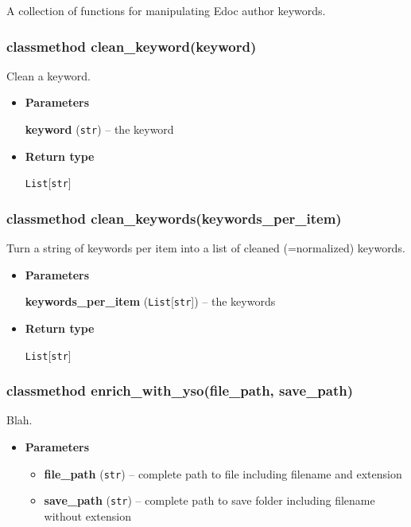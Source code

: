 A collection of functions for manipulating Edoc author keywords.

\hypertarget{classmethod-clean_keywordkeyword}{%
\subsubsection{classmethod
clean\_keyword(keyword)}\label{classmethod-clean_keywordkeyword}}

Clean a keyword.

\begin{itemize}
\item
  \textbf{Parameters}

  \textbf{keyword} (\texttt{str}) -- the keyword
\item
  \textbf{Return type}

  \texttt{List}{[}\texttt{str}{]}
\end{itemize}

\hypertarget{classmethod-clean_keywordskeywords_per_item}{%
\subsubsection{classmethod
clean\_keywords(keywords\_per\_item)}\label{classmethod-clean_keywordskeywords_per_item}}

Turn a string of keywords per item into a list of cleaned (=normalized)
keywords.

\begin{itemize}
\item
  \textbf{Parameters}

  \textbf{keywords\_per\_item} (\texttt{List}{[}\texttt{str}{]}) -- the
  keywords
\item
  \textbf{Return type}

  \texttt{List}{[}\texttt{str}{]}
\end{itemize}

\hypertarget{classmethod-enrich_with_ysofile_path-save_path}{%
\subsubsection{classmethod enrich\_with\_yso(file\_path,
save\_path)}\label{classmethod-enrich_with_ysofile_path-save_path}}

Blah.

\begin{itemize}
\item
  \textbf{Parameters}

  \begin{itemize}
  \item
    \textbf{file\_path} (\texttt{str}) -- complete path to file
    including filename and extension
  \item
    \textbf{save\_path} (\texttt{str}) -- complete path to save folder
    including filename without extension
  \end{itemize}
\end{itemize}

